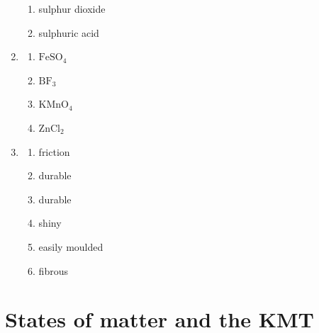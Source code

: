 \begin{multicols}{3}
\begin{enumerate}[itemsep=5pt, label=\textbf{\arabic*}. ]
\begin{enumerate}[itemsep=5pt,label=\textbf{(\alph*)}]
 \item sulphur dioxide
 \item sulphuric acid
\end{enumerate}
\item %
\begin{enumerate}[itemsep=5pt,label=\textbf{(\alph*)}]
 \item $\text{FeSO}_{4}$
 \item $\text{BF}_{3}$
 \item $\text{KMnO}_{4}$
 \item $\text{ZnCl}_{2}$
\end{enumerate}
\item %
\begin{enumerate}[itemsep=5pt,label=\textbf{(\alph*)}]
 \item friction
 \item durable
 \item durable
 \item shiny
 \item easily moulded
 \item fibrous
\end{enumerate}
\end{enumerate}
\end{multicols}

\section{States of matter and the KMT}
